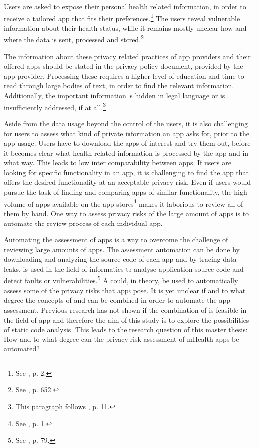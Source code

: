 \documentclass[
	a4paper,
	oneside,
	12pt,
	liststotocnumbered
]{article}
\let\cite\textcite
\begin{document}
Users are asked to expose their personal health related information, in order to receive a tailored app that fits their preferences.\footnote{See \cite{Chen2012}, p. 2.}
The users reveal vulnerable information about their health status, while it remains mostly unclear how and where the data is sent, processed and stored.\footnote{See \cite{He2014}, p. 652.}

The information about these privacy related practices of app providers and their offered apps should be stated in the privacy policy document, provided by the app provider.
Processing these \pps requires a higher level of education and time to read through large bodies of text, in order to find the relevant information. 
Additionally, the important information is hidden in legal language or is  insufficiently addressed, if at all.\footnote{This paragraph follows \cite{Dehling2014}, p. 11.}

Aside from the data usage beyond the control of the users, it is also challenging for users to assess what kind of private information an app asks for, prior to the app usage. 
Users have to download the apps of interest and try them out, before it becomes clear what health related information is processed by the app and in what way. 
This leads to low inter comparability between apps. 
If users are looking for specific functionality in an \mH app, it is challenging to find the app that offers the desired functionality at an acceptable privacy risk. 
Even if users would pursue the task of finding and comparing \mH apps of similar functionality, the high volume of apps available on the app stores\footnote{See \cite{Enck2011}, p. 1.} makes it laborious to review all of them by hand.
One way to assess privacy risks of the large amount of \mH apps is to automate the review process of each individual app. 

Automating the assessment of \mH apps is a way to overcome the challenge of reviewing large amounts of \mH apps.
The assessment automation can be done by downloading and analyzing the source code of each app and by tracing data leaks. 
\Sca is used in the field of informatics to analyse application source code and detect faults or vulnerabilities.\footnote{See \cite{Baca2008}, p. 79.} 
A \sca could, in theory, be used to automatically assess some of the privacy risks that \mH apps pose.
It is yet unclear if and to what degree the concepts of \sca and \pra can be combined in order to automate the app assessment.
Previous research has not shown if the combination of \sca is feasible in the field of \mH app \pra and therefore the aim of this study is to explore the possibilities of static code analysis. 
This leads to the research question of this master thesis: How and to what degree can the privacy risk assessment of mHealth apps be automated?
\end{document}
